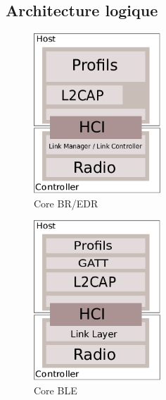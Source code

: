 \subsection{Architecture logique}
\begin{frame}


\begin{minipage}[t]{0.47\linewidth}
	\begin{figure}
		\includegraphics[height=6cm]{arch_core.png}
		\caption{Core BR/EDR}
	\end{figure}
\end{minipage}
\begin{minipage}[t]{0.45\linewidth}
	\begin{figure}
		\includegraphics[height=6cm]{arch_core_ble.png}
		\caption{Core BLE}
	\end{figure}
\end{minipage}
\end{frame}
